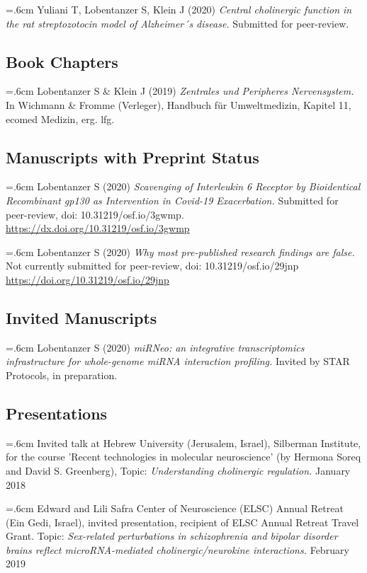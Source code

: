\noindent \hangindent=.6cm Yuliani T, Lobentanzer S, Klein J (2020) \emph{Central cholinergic function in the rat streptozotocin model of Alzheimer´s disease.} Submitted for peer-review.

\subsection{Book Chapters}
\noindent \hangindent=.6cm Lobentanzer S \& Klein J (2019) \emph{Zentrales und Peripheres Nervensystem.} In Wichmann \& Fromme (Verleger), Handbuch für Umweltmedizin, Kapitel 11, ecomed Medizin, erg. lfg.

\subsection{Manuscripts with Preprint Status}
\noindent \hangindent=.6cm Lobentanzer S (2020) \emph{Scavenging of Interleukin 6 Receptor by Bioidentical Recombinant gp130 as Intervention in Covid-19 Exacerbation.} Submitted for peer-review, doi: 10.31219/osf.io/3gwmp. \url{https://dx.doi.org/10.31219/osf.io/3gwmp}

\noindent \hangindent=.6cm Lobentanzer S (2020) \emph{Why most pre-published research findings are false.} Not currently submitted for peer-review, doi: 10.31219/osf.io/29jnp \url{https://doi.org/10.31219/osf.io/29jnp}

\subsection{Invited Manuscripts}
\noindent \hangindent=.6cm Lobentanzer S (2020) \emph{miRNeo: an integrative transcriptomics infrastructure for whole-genome miRNA interaction profiling.} Invited by STAR Protocols, in preparation.

\subsection{Presentations}
\noindent \hangindent=.6cm Invited talk at Hebrew University (Jerusalem, Israel), Silberman Institute, for the course 'Recent technologies in molecular neuroscience' (by Hermona Soreq and David S. Greenberg), Topic: \emph{Understanding cholinergic regulation.} January 2018

\noindent \hangindent=.6cm Edward and Lili Safra Center of Neuroscience (ELSC) Annual Retreat (Ein Gedi, Israel), invited presentation, recipient of ELSC Annual Retreat Travel Grant. Topic: \emph{Sex-related perturbations in schizophrenia and bipolar disorder brains reflect microRNA-mediated cholinergic/neurokine interactions.} February 2019

